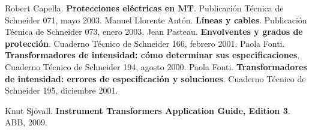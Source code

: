 \begin{thebibliography}{99}
     Robert Capella. \textbf{Protecciones eléctricas en MT}.  Publicación Técnica de Schneider 071, mayo 2003.
     Manuel Llorente Antón. \textbf{Líneas y cables}.  Publicación Técnica de Schneider 073, enero 2003.
     Jean Pasteau. \textbf{Envolventes y grados de protección}.  Cuaderno Técnico de Schneider 166, febrero 2001.
     Paola Fonti. \textbf{Transformadores de intensidad: cómo determinar sus especificaciones}.  Cuaderno Técnico de Schneider 194, agosto 2000.
     Paola Fonti. \textbf{Transformadores de intensidad: errores de especificación y soluciones}.  Cuaderno Técnico de Schneider 195, diciembre 2001.

     Knut Sjövall. \textbf{Instrument Transformers Application Guide, Edition 3}.  ABB, 2009.

\end{thebibliography}
